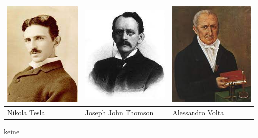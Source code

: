 \documentclass[a4paper]{scrartcl}
\begin{document}
\begin{aufgabe}[points={6}]
\begin{longtable}{|>{\centering\arraybackslash}p{4.2cm}|>{\centering\arraybackslash}p{4.2cm}|>{\centering\arraybackslash}p{4.2cm}|}
\includegraphics[scale=0.5]{Tesla.jpg} & \includegraphics[scale=0.5]{Thomson.jpg} & \includegraphics[scale=0.5]{Volta.jpg} \\ 
	\hline 
	Nikola Tesla & Joseph John Thomson & Alessandro Volta \\ 
	\hline 
	\end{longtable}
	
    \begin{loesung}
    keine
    \end{loesung}
\end{aufgabe}
\vspace{0.3cm}
\end{document}

